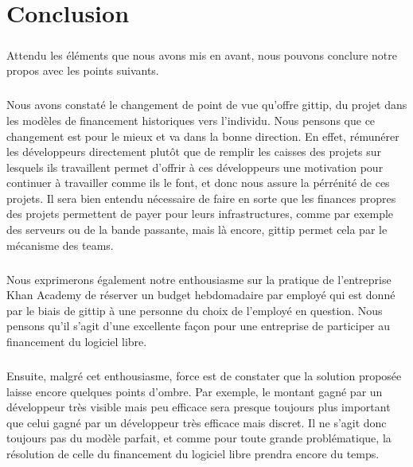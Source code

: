 \chapter*{Conclusion}



\paragraph{}
Attendu les éléments que nous avons mis en avant, nous pouvons conclure notre 
propos avec les points suivants.

\paragraph{}
Nous avons constaté le changement de point de vue qu'offre gittip, du projet 
dans les modèles de financement historiques vers l'individu.
Nous pensons que ce changement est pour le mieux et va dans la bonne 
direction.
En effet, rémunérer les développeurs directement plutôt que de remplir les 
caisses des projets sur lesquels ils travaillent permet d'offrir à ces 
développeurs une motivation pour continuer à travailler comme ils le font, et 
donc nous assure la pérrénité de ces projets.
Il sera bien entendu nécessaire de faire en sorte que les finances propres des 
projets permettent de payer pour leurs infrastructures, comme par exemple des 
serveurs ou de la bande passante, mais là encore, gittip permet cela par le 
mécanisme des teams.

\paragraph{}
Nous exprimerons également notre enthousiasme sur la pratique de l'entreprise 
Khan Academy de réserver un budget hebdomadaire par employé qui est donné par 
le biais de gittip à une personne du choix de l'employé en question.
Nous pensons qu'il s'agit d'une excellente façon pour une entreprise de 
participer au financement du logiciel libre.

\paragraph{}
Ensuite, malgré cet enthousiasme, force est de constater que la solution 
proposée laisse encore quelques points d'ombre. Par exemple, le montant gagné 
par un développeur très visible mais peu efficace sera presque toujours plus 
important que celui gagné par un développeur très efficace mais discret.
Il ne s'agit donc toujours pas du modèle parfait, et comme pour toute grande 
problématique, la résolution de celle du financement du logiciel libre prendra 
encore du temps.

